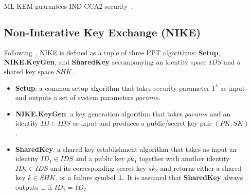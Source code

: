 
ML-KEM guarantees IND-CCA2 security~\cite{ml-kem-ind-cca,crystal-kyber}.





\subsection{Non-Interative Key Exchange (NIKE)}
Following~\cite{nike-definition,nike-abstract}, NIKE is defined as a tuple of three
PPT algorithms: \textbf{Setup}, \textbf{NIKE.KeyGen}, and \textbf{SharedKey} accompanying
an identity space $IDS$ and a shared key space $SHK$.
\begin{itemize}
    \item \textbf{Setup}: a common setup algorithm that takes security parameter $1^\lambda$
    as input and outputs a set of system parameters $params$.
    \item \textbf{NIKE.KeyGen}: a key generation algorithm that takes $params$ and an identity
    $ID \in IDS$ as input and produces a public/secret key pair $(PK,SK)$.
    \item \textbf{SharedKey}: a shared key establishment algorithm that takes as input an
    identity $ID_1 \in IDS$ and a public key $pk_1$ together with another identity
    $ID_2 \in IDS$ and its corresponding secret key $sk_2$ and returns either a shared key $k \in SHK$,
    or a failure symbol $\bot$. It is assumed that \textbf{SharedKey} always outputs
    $\bot$ if $ID_1 = ID_2$
\end{itemize}

